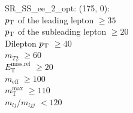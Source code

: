 SR\_SS\_ee\_2\_opt: (175, 0): \\
$p_{\text{T}}$ of the leading lepton $\geq 35$ \\
$p_{\text{T}}$ of the subleading lepton $\geq 20$ \\
Dilepton $p_{\text{T}}$ $\geq 40$ \\
$m_{T2}$ $\geq 60$ \\
$E_{\text{T}}^{\text{miss,rel}}$ $\geq 20$ \\
$m_{\text{eff}}$ $\geq 100$ \\
$m_{\text{T}}^{\text{max}}$ $\geq 110$ \\
$m_{lj}$/$m_{ljj}$ $<120$ \\
